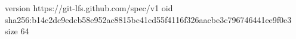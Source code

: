 version https://git-lfs.github.com/spec/v1
oid sha256:b14c2dc9edcb58e952ac8815bc41cd55f4116f326aacbe3c796746441ee9f0e3
size 64
